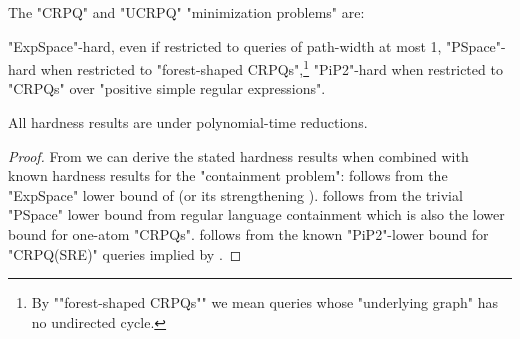 \begin{corollary}
	\AP\label{coro:lowerbounds}
	The "CRPQ" and "UCRPQ" "minimization problems" are:
	\begin{enumerate}
		\itemAP\label{expspace-h:pw1}"ExpSpace"-hard, even
		if restricted to queries of path-width at most 1,
		\itemAP\label{pspace:forest} "PSpace"-hard when restricted to "forest-shaped CRPQs",\footnote{By \AP""forest-shaped CRPQs"" we mean queries whose "underlying graph" has no undirected cycle.}
		\itemAP\label{pip2:crpqsre} "PiP2"-hard when restricted to "CRPQs" over "positive simple regular expressions".
	\end{enumerate}
	All hardness results are under polynomial-time reductions.
\end{corollary}

\begin{proof}
	From  we can derive the stated hardness results when combined with known hardness results for the "containment problem":
	 follows from the "ExpSpace" lower bound of \cite[Lemma 8]{Figueira2020Containment} (or its strengthening ).
%
	 follows from the trivial "PSpace" lower bound from regular language containment which is also the lower bound for one-atom "CRPQs".
%
	 follows from the known "PiP2"-lower bound for "CRPQ(SRE)" queries implied by \cite[Theorem 4.2]{FigueiraEtal2020Containment}.
\end{proof}